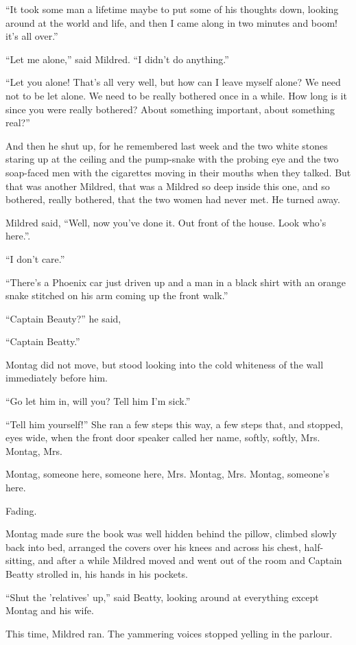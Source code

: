 \documentclass[11pt,openany]{book}
\begin{document}
``It took some man a lifetime maybe to put some of his thoughts down, looking around at the world and life, and then I came along in two minutes and boom! it's all over.''

``Let me alone,'' said Mildred. ``I didn't do anything.''

``Let you alone! That's all very well, but how can I leave myself alone? We need not to be let alone. We need to be really bothered once in a while. How long is it since you were really bothered? About something important, about something real?''

And then he shut up, for he remembered last week and the two white stones staring up at the ceiling and the pump-snake with the probing eye and the two soap-faced men with the cigarettes moving in their mouths when they talked. But that was another Mildred, that was a Mildred so deep inside this one, and so bothered, really bothered, that the two women had never met. He turned away.

Mildred said, ``Well, now you've done it. Out front of the house. Look who's here.''.

``I don't care.''

``There's a Phoenix car just driven up and a man in a black shirt with an orange snake stitched on his arm coming up the front walk.''

``Captain Beauty?'' he said,

``Captain Beatty.''

Montag did not move, but stood looking into the cold whiteness of the wall immediately before him.

``Go let him in, will you? Tell him I'm sick.''

``Tell him yourself!'' She ran a few steps this way, a few steps that, and stopped, eyes wide, when the front door speaker called her name, softly, softly, Mrs. Montag, Mrs.

Montag, someone here, someone here, Mrs. Montag, Mrs. Montag, someone's here.

Fading.

Montag made sure the book was well hidden behind the pillow, climbed slowly back into bed, arranged the covers over his knees and across his chest, half-sitting, and after a while Mildred moved and went out of the room and Captain Beatty strolled in, his hands in his pockets.

``Shut the 'relatives' up,'' said Beatty, looking around at everything except Montag and his wife.

This time, Mildred ran. The yammering voices stopped yelling in the parlour.
\end{document}
